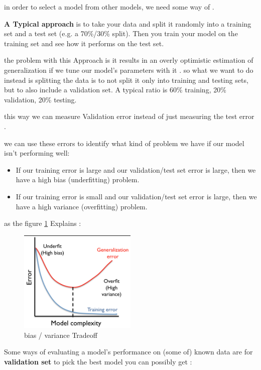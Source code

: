 in order to select a model from other models, we need some way of  .


\textbf{A Typical approach } is to take your data and split it randomly into a training set and a test set (e.g. a 70\%/30\% split). Then you train your model on the training set and see how it performs on the test set.

the problem with this Approach is it results in an overly optimistic estimation of generalization if we tune our model's parameters with it . so what we want to do instead is splitting the data is to not split it only into training and testing sets, but to also include a validation set. A typical ratio is 60\% training, 20\% validation, 20\% testing.

this way we can measure Validation error instead of just measuring the test error .

we can use these errors   to identify what kind of problem we have if our model isn't performing well:

\begin{itemize}
\item If our training error is large and our validation/test set error is large, then we have a high bias (underfitting) problem.
\item If our training error is small and our validation/test set error is large, then we have a high variance (overfitting) problem.
\end{itemize}

as the figure \ref{fig:bias} Explains : 

\begin{figure}[H]
\centering
\includegraphics[width=0.5\textwidth]{img/model.png}
\caption{ bias / variance Tradeoff}
\label{fig:bias}
\end{figure}

Some ways of evaluating a model's performance on (some of)  known data are for \textbf{validation set } to pick  the best model you can possibly get :

